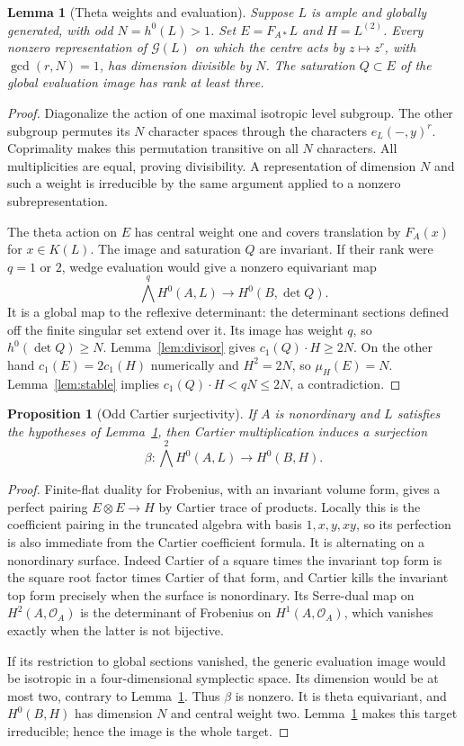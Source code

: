 \documentclass[11pt]{article}
\newtheorem{proposition}[theorem]{Proposition}
\newtheorem{lemma}[theorem]{Lemma}
\theoremstyle{definition}\newtheorem{definition}[theorem]{Definition}
\theoremstyle{remark}\newtheorem{remark}[theorem]{Remark}
\newcommand{\OO}{\mathcal O}
\begin{document}
\begin{lemma}[Theta weights and evaluation]\label{lem:evaluation}
Suppose $L$ is ample and globally generated, with odd $N=h^0(L)>1$. Set $E=F_{A*}L$ and $H=L^{(2)}$. Every nonzero representation of $\mathcal G(L)$ on which the centre acts by $z\mapsto z^r$, with $\gcd(r,N)=1$, has dimension divisible by $N$. The saturation $Q\subset E$ of the global evaluation image has rank at least three.
\end{lemma}
\begin{proof}
Diagonalize the action of one maximal isotropic level subgroup. The other subgroup permutes its $N$ character spaces through the characters $e_L(-,y)^r$. Coprimality makes this permutation transitive on all $N$ characters. All multiplicities are equal, proving divisibility. A representation of dimension $N$ and such a weight is irreducible by the same argument applied to a nonzero subrepresentation.

The theta action on $E$ has central weight one and covers translation by $F_A(x)$ for $x\in K(L)$. The image and saturation $Q$ are invariant. If their rank were $q=1$ or $2$, wedge evaluation would give a nonzero equivariant map
\[
 \bigwedge^q H^0(A,L)\longrightarrow H^0(B,\det Q).
\]
It is a global map to the reflexive determinant: the determinant sections defined off the finite singular set extend over it. Its image has weight $q$, so $h^0(\det Q)\ge N$. Lemma~\ref{lem:divisor} gives $c_1(Q)\cdot H\ge2N$. On the other hand $c_1(E)=2c_1(H)$ numerically and $H^2=2N$, so $\mu_H(E)=N$. Lemma~\ref{lem:stable} implies $c_1(Q)\cdot H<qN\le2N$, a contradiction.
\end{proof}

\begin{proposition}[Odd Cartier surjectivity]\label{prop:surjection}
If $A$ is nonordinary and $L$ satisfies the hypotheses of Lemma~\ref{lem:evaluation}, then Cartier multiplication induces a surjection
\[
 \beta:\bigwedge^2H^0(A,L)\longrightarrow H^0(B,H).
\]
\end{proposition}
\begin{proof}
Finite-flat duality for Frobenius, with an invariant volume form, gives a perfect pairing $E\otimes E\to H$ by Cartier trace of products. Locally this is the coefficient pairing in the truncated algebra with basis $1,x,y,xy$, so its perfection is also immediate from the Cartier coefficient formula. It is alternating on a nonordinary surface. Indeed Cartier of a square times the invariant top form is the square root factor times Cartier of that form, and Cartier kills the invariant top form precisely when the surface is nonordinary. Its Serre-dual map on $H^2(A,\OO_A)$ is the determinant of Frobenius on $H^1(A,\OO_A)$, which vanishes exactly when the latter is not bijective.

If its restriction to global sections vanished, the generic evaluation image would be isotropic in a four-dimensional symplectic space. Its dimension would be at most two, contrary to Lemma~\ref{lem:evaluation}. Thus $\beta$ is nonzero. It is theta equivariant, and $H^0(B,H)$ has dimension $N$ and central weight two. Lemma~\ref{lem:evaluation} makes this target irreducible; hence the image is the whole target.
\end{proof}
\end{document}
